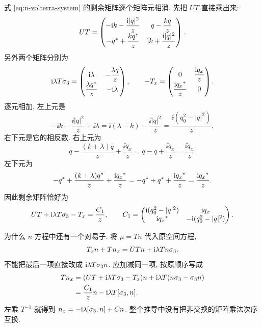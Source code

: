 \par\smallskip\noindent 式 \eqref{eq:n-volterra-system} 的剩余矩阵逐个矩阵元相消.\quad
先把 $U T$ 直接乘出来:
\begin{equation*}
U T=\begin{pmatrix}
-\mathrm{i} k-\dfrac{\mathrm{i}|q|^2}{z}&q-\dfrac{kq}{z}\\
-{q}^{*}+\dfrac{k{q}^{*}}{z}&\mathrm{i} k+\dfrac{\mathrm{i}|q|^2}{z}
\end{pmatrix}.
\end{equation*}
另外两个矩阵分别为
\begin{equation*}
\mathrm{i}\lambda T\sigma_3
=\begin{pmatrix}
\mathrm{i}\lambda&-\dfrac{\lambda q}{z}\\
\dfrac{\lambda{q}^{*}}{z}&-\mathrm{i}\lambda
\end{pmatrix},
\qquad
- T_x
=\begin{pmatrix}0&\dfrac{\mathrm{i} q_x}{z}\\
\dfrac{\mathrm{i}{q_x}^{*}}{z}&0\end{pmatrix}.
\end{equation*}
逐元相加, 左上元是
\begin{equation*}
-\ii k-\dfrac{\ii|q|^2}{z}+\ii\lambda
=\ii(\lambda-k)-\dfrac{\ii|q|^2}{z}
=\dfrac{\ii(q_0^2-|q|^2)}{z}.
\end{equation*}
右下元是它的相反数.
右上元为
\begin{equation*}
q-\dfrac{(k+\lambda)q}{z}+\dfrac{\ii q_x}{z}
=q-q+\dfrac{\ii q_x}{z}
=\dfrac{\ii q_x}{z}.
\end{equation*}
左下元为
\begin{equation*}
-{q}^{*}+\dfrac{(k+\lambda){q}^{*}}{z}
+\dfrac{\mathrm{i}{q_x}^{*}}{z}
=-{q}^{*}+{q}^{*}+\dfrac{\mathrm{i}{q_x}^{*}}{z}
=\dfrac{\mathrm{i}{q_x}^{*}}{z}.
\end{equation*}
因此剩余矩阵恰好为
\begin{equation*}
U T+\mathrm{i}\lambda T\sigma_3- T_x
=\dfrac{ C_1}{z},
\qquad
 C_1=\begin{pmatrix}
\mathrm{i}(q_0^2-|q|^2)&\mathrm{i} q_x\\
\mathrm{i}{q_x}^{*}&-\mathrm{i}(q_0^2-|q|^2)
\end{pmatrix}.
\end{equation*}

\par\smallskip\noindent 为什么 $n$ 方程中还有一个对易子.\quad
将 $\mu= Tn$ 代入原空间方程,
\begin{equation*}
 T_xn+ Tn_x
=U Tn+\mathrm{i}\lambda Tn\sigma_3.
\end{equation*}
不能把最后一项直接改成 $\mathrm{i}\lambda T\sigma_3 n$.
应加减同一项, 按原顺序写成
\begin{align*}
 Tn_x
&=(U T+\mathrm{i}\lambda T\sigma_3- T_x)n
+\mathrm{i}\lambda T(n\sigma_3-\sigma_3 n)\\
&=\dfrac{ C_1}{z}n
-\mathrm{i}\lambda T[\sigma_3,n].
\end{align*}
左乘 $ T^{-1}$ 就得到
$n_x=-\mathrm{i}\lambda[\sigma_3,n]+ Cn$.
整个推导中没有把非交换的矩阵乘法次序互换.


